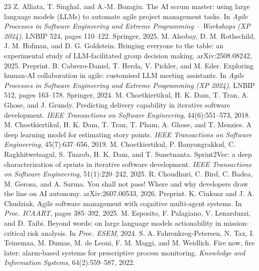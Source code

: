 \documentclass[pmlr]{jmlr}
\begin{document}
\begin{thebibliography}{23}
 Z. Alliata, T. Singhal, and A.-M. Bozagiu. The AI scrum master: using large language models (LLMs) to automate agile project management tasks. In \emph{Agile Processes in Software Engineering and Extreme Programming -- Workshops (XP 2024)}, LNBIP 524, pages 110--122. Springer, 2025.
 M. Alsobay, D. M. Rothschild, J. M. Hofman, and D. G. Goldstein. Bringing everyone to the table: an experimental study of LLM-facilitated group decision making. arXiv:2508.08242, 2025. Preprint.
 B. Cabrero-Daniel, T. Herda, V. Pichler, and M. Eder. Exploring human-AI collaboration in agile: customised LLM meeting assistants. In \emph{Agile Processes in Software Engineering and Extreme Programming (XP 2024)}, LNBIP 512, pages 163--178. Springer, 2024.
 M. Choetkiertikul, H. K. Dam, T. Tran, A. Ghose, and J. Grundy. Predicting delivery capability in iterative software development. \emph{IEEE Transactions on Software Engineering}, 44(6):551--573, 2018.
 M. Choetkiertikul, H. K. Dam, T. Tran, T. Pham, A. Ghose, and T. Menzies. A deep learning model for estimating story points. \emph{IEEE Transactions on Software Engineering}, 45(7):637--656, 2019.
 M. Choetkiertikul, P. Banyongrakkul, C. Ragkhitwetsagul, S. Tuarob, H. K. Dam, and T. Sunetnanta. Sprint2Vec: a deep characterization of sprints in iterative software development. \emph{IEEE Transactions on Software Engineering}, 51(1):220--242, 2025.
 R. Choudhuri, C. Bird, C. Badea, M. Gerosa, and A. Sarma. You shall not pass! Where and why developers draw the line on AI autonomy. arXiv:2607.00533, 2026. Preprint.
 K. Cinkusz and J. A. Chudziak. Agile software management with cognitive multi-agent systems. In \emph{Proc. ICAART}, pages 385--392, 2025.
 M. Esposito, F. Palagiano, V. Lenarduzzi, and D. Taibi. Beyond words: on large language models actionability in mission-critical risk analysis. In \emph{Proc. ESEM}, 2024.
 S. A. Fahrenkrog-Petersen, N. Tax, I. Teinemaa, M. Dumas, M. de Leoni, F. M. Maggi, and M. Weidlich. Fire now, fire later: alarm-based systems for prescriptive process monitoring. \emph{Knowledge and Information Systems}, 64(2):559--587, 2022.

\end{thebibliography}
\end{document}

